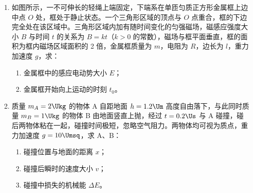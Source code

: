 \documentclass[\gkver]{gaokaozhenti}
\begin{document}
\begin{enumerate}
{（6）A．电压表分流属于系统误差，故 A 正确；

B．为保护电路，实验开始前滑动变阻器滑片应该调到 $a$ 端，使电压表示数为零，故 B 错误；

C．如图所示的电路为分压式电路，可以通过调节滑片使电压表示数为 $0$，即滑动变阻器滑片调到 $a$ 端，电压表示数为零，故 C 正确；

D．通过测量多组数据绘制 $U-I$ 图像可减小偶然误差，故 D 错误。

故选 AC。
}

\item
如图所示，一不可伸长的轻绳上端固定，下端系在单匝匀质正方形金属框上边中点 $O$ 处，框处于静止状态。一个三角形区域的顶点与 $O$ 点重合，框的下边完全处在该区域中。三角形区域内加有随时间变化的匀强磁场，磁感应强度大小 $B$ 与时间 $t$ 的关系为 $B = kt$（$k > 0$ 的常数），磁场与框平面垂直，框的面积为框内磁场区域面积的 2 倍，金属框质量为 $m$，电阻为 $R$，边长为 $l$，重力加速度 $g$，求：
\begin{enumerate}
	\item
	金属框中的感应电动势大小 $E$；
	\item
	金属框开始向上运动的时刻 $t_{0}$。
\end{enumerate}

\onepicture[align=right, h=2.86cm]{}


\item
质量 $m_{A} = 2 \Ukg$ 的物体 A 自距地面 $h = 1.2 \Um$ 高度自由落下，与此同时质量 $m_{B} = 1 \Ukg$ 的物体 B 由地面竖直上抛，经过 $t = 0.2 \Us$ 与 A 碰撞，碰后两物体粘在一起，碰撞时间极短，忽略空气阻力。两物体均可视为质点，重力加速度 $g = 10 \Umsq$，求 A、B：
\begin{enumerate}
	\item
	碰撞位置与地面的距离 $x$；
	\item
	碰撞后瞬时的速度大小 $v$；
	\item
	碰撞中损失的机械能 $\Delta E$。
\end{enumerate}


\end{enumerate}
\end{document}
